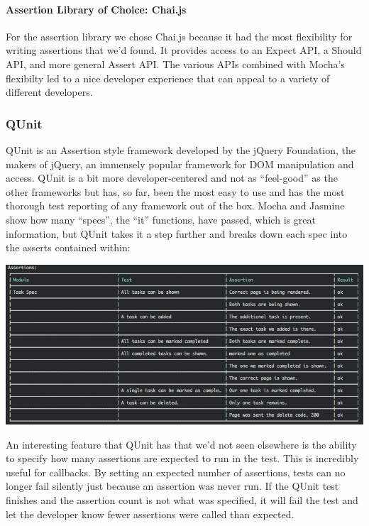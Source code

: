 \documentclass[11pt]{article}
\newenvironment{Figure}
  {\par\medskip\noindent\minipage{\linewidth}}
  {\endminipage\par\medskip}
\begin{document}
\paragraph{Assertion Library of Choice: Chai.js \cite{Chaijs}}
For the assertion library we chose Chai.js because it had the most flexibility for writing assertions that we'd found. It provides access to an Expect API, a Should API, and more general Assert API. The various APIs combined with Mocha's flexibilty led to a nice developer experience that can appeal to a variety of different developers.


\subsubsection{QUnit \cite{QUnit}}
QUnit is an Assertion style framework developed by the jQuery Foundation, the makers of jQuery, an immensely popular framework for DOM manipulation and access. QUnit is a bit more developer-centered and not as ``feel-good'' as the other frameworks but has, so far, been the most easy to use and has the most thorough test reporting of any framework out of the box. Mocha and Jasmine show how many ``specs'', the ``it'' functions, have passed, which is great information, but QUnit takes it a step further and breaks down each spec into the asserts contained within:
\begin{Figure}
  \centering
  \includegraphics[width=\linewidth]{qunitrunner.png} 
\end{Figure}
An interesting feature that QUnit has that we'd not seen elsewhere is the ability to specify how many assertions are expected to run in the test. This is incredibly useful for callbacks. By setting an expected number of assertions, tests can no longer fail silently just because an assertion was never run. If the QUnit test finishes and the assertion count is not what was specified, it will fail the test and let the developer know fewer assertions were called than expected.
\end{document}
